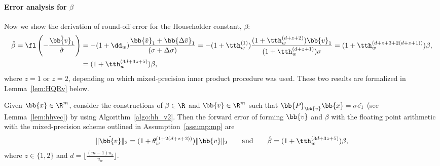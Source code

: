 \paragraph{Error analysis for $\beta$}
Now we show the derivation of round-off error for the Householder constant, $\beta$:
\begin{align*}
\hat{\beta} = \fl\left(-\frac{\hat{\bb{v}_1}}{\hat{\sigma}}\right) &=-(1+\dd_w)\frac{\bb{\tilde{v}}_1+\bb{\Delta \tilde{v}}_1}{(\sigma + \Delta\sigma)} %
= -(1+\tth_w^{(1)})\frac{ (1+\tth_w^{(d+z+2)})\bb{v}_1}{(1+\tth_w^{(d+z+1)})\sigma} %
= (1+\tth_w^{(d+z+3+2(d+z+1))})\beta,\\
&= (1+\tth_w^{(3d+3z+5)})\beta,
\end{align*}
where $z=1$ or $z=2$, depending on which mixed-precision inner product procedure was used. 
These two results are formalized in Lemma~\ref{lem:HQRv} below.
\begin{lemma}
	\label{lem:HQRv}
	Given $\bb{x}\in\R^{m}$, consider the constructions of $\beta\in\R$ and $\bb{v}\in\R^{m}$ such that $\bb{P}_{\bb{v}}\bb{x}=\sigma\hat{e_1}$ (see Lemma~\ref{lem:hhvec}) by using Algorithm~\ref{algo:hh_v2}.
	Then the forward error of forming $\bb{v}$ and $\beta$ with the floating point arithmetic with the
	mixed-precision scheme outlined in Assumption~\ref{assump:mp} are
	\begin{equation*}
	\|\hat{\bb{v}}\|_2 = (1+\theta_w^{(1+2(d+z+2))})\|\bb{v}\|_2 \qquad \mbox{and} \qquad
	\hat{\beta} = (1+\tth_w^{(3d+3z+5)})\beta,
	\end{equation*}
	where $z\in\{1,2\}$ and $d=\lfloor\frac{(m-1)u_s}{u_w}\rfloor$.
\end{lemma}
%
